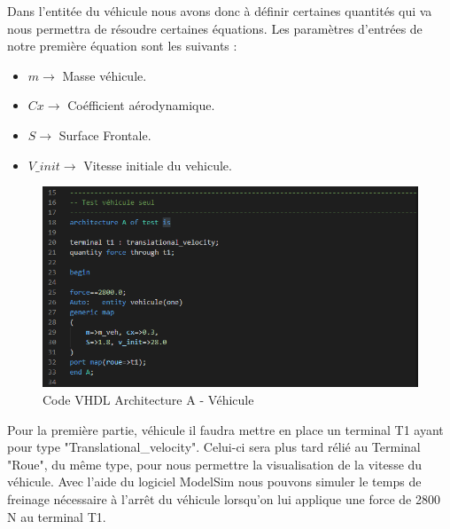 Dans l'entitée du véhicule nous avons donc à définir certaines quantités qui va nous permettra de résoudre certaines équations. Les paramètres d'entrées de notre première équation sont les suivants :\\

\begin{itemize}
        \item $m        \rightarrow$ Masse véhicule.
        \item $Cx       \rightarrow$ Coéfficient aérodynamique.
        \item $S        \rightarrow$ Surface Frontale.
        \item $V\_init  \rightarrow$ Vitesse initiale du vehicule.
\end{itemize}

\begin{figure}[h]
    \centering
    \includegraphics[width=\textwidth]{images/vehicule.png}
    \caption{Code VHDL Architecture A - Véhicule}
\end{figure}

Pour la première partie, véhicule il faudra mettre en place un terminal T1 ayant pour type "Translational\_velocity". Celui-ci sera plus tard rélié au Terminal "Roue", du même type, pour nous permettre la visualisation de la vitesse du véhicule.
\newpage
Avec l'aide du logiciel ModelSim nous pouvons simuler le temps de freinage nécessaire à l'arrêt du véhicule lorsqu'on lui applique une force de 2800 N au terminal T1.

